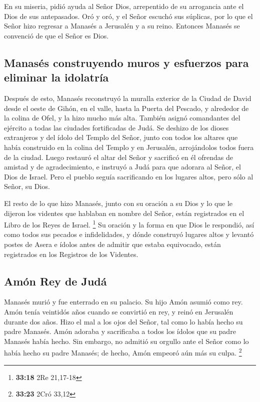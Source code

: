  En su miseria, pidió ayuda al Señor Dios, arrepentido de
su arrogancia ante el Dios de sus antepasados.  Oró y
oró, y el Señor escuchó sus súplicas, por lo que el Señor hizo regresar
a Manasés a Jerusalén y a su reino. Entonces Manasés se convenció de que
el Señor es Dios.

\hypertarget{manasuxe9s-construyendo-muros-y-esfuerzos-para-eliminar-la-idolatruxeda}{%
\subsection{Manasés construyendo muros y esfuerzos para eliminar la
idolatría}\label{manasuxe9s-construyendo-muros-y-esfuerzos-para-eliminar-la-idolatruxeda}}

 Después de esto, Manasés reconstruyó la muralla exterior
de la Ciudad de David desde el oeste de Gihón, en el valle, hasta la
Puerta del Pescado, y alrededor de la colina de Ofel, y la hizo mucho
más alta. También asignó comandantes del ejército a todas las ciudades
fortificadas de Judá.  Se deshizo de los dioses
extranjeros y del ídolo del Templo del Señor, junto con todos los
altares que había construido en la colina del Templo y en Jerusalén,
arrojándolos todos fuera de la ciudad.  Luego restauró el
altar del Señor y sacrificó en él ofrendas de amistad y de
agradecimiento, e instruyó a Judá para que adorara al Señor, el Dios de
Israel.  Pero el pueblo seguía sacrificando en los
lugares altos, pero sólo al Señor, su Dios.

 El resto de lo que hizo Manasés, junto con su oración a
su Dios y lo que le dijeron los videntes que hablaban en nombre del
Señor, están registrados en el Libro de los Reyes de Israel. \footnote{\textbf{33:18}
  2Re 21,17-18}  Su oración y la forma en que Dios le
respondió, así como todos sus pecados e infidelidades, y dónde construyó
lugares altos y levantó postes de Asera e ídolos antes de admitir que
estaba equivocado, están registrados en los Registros de los Videntes.

\hypertarget{amuxf3n-rey-de-juduxe1}{%
\subsection{Amón Rey de Judá}\label{amuxf3n-rey-de-juduxe1}}

 Manasés murió y fue enterrado en su palacio. Su hijo
Amón asumió como rey.  Amón tenía veintidós años cuando
se convirtió en rey, y reinó en Jerusalén durante dos años.
 Hizo el mal a los ojos del Señor, tal como lo había
hecho su padre Manasés. Amón adoraba y sacrificaba a todos los ídolos
que su padre Manasés había hecho.  Sin embargo, no
admitió su orgullo ante el Señor como lo había hecho su padre Manasés;
de hecho, Amón empeoró aún más su culpa. \footnote{\textbf{33:23} 2Cró
  33,12}

